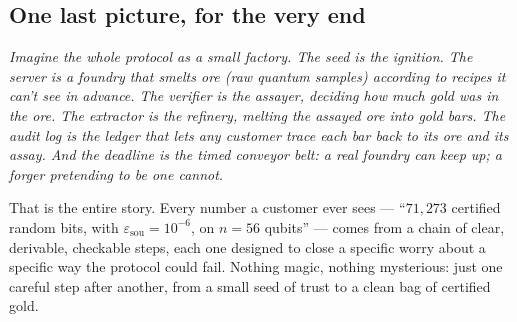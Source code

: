 \documentclass[11pt]{article}
\newenvironment{aside}{\par\medskip\noindent\itshape\small\color{black!70}}{\normalfont\par\medskip}
\newcommand{\eps}{\varepsilon}
\newcommand{\epssou}{\eps_{\text{sou}}}
\begin{document}
\subsection*{One last picture, for the very end}

\begin{aside}
Imagine the whole protocol as a small factory. The seed is the ignition. The server is a foundry that smelts ore (raw quantum samples) according to recipes it can't see in advance. The verifier is the assayer, deciding how much gold was in the ore. The extractor is the refinery, melting the assayed ore into gold bars. The audit log is the ledger that lets any customer trace each bar back to its ore and its assay. And the deadline is the timed conveyor belt: a real foundry can keep up; a forger pretending to be one cannot.
\end{aside}

That is the entire story. Every number a customer ever sees --- ``$71{,}273$ certified random bits, with $\epssou = 10^{-6}$, on $n=56$ qubits'' --- comes from a chain of clear, derivable, checkable steps, each one designed to close a specific worry about a specific way the protocol could fail. Nothing magic, nothing mysterious: just one careful step after another, from a small seed of trust to a clean bag of certified gold.
\end{document}
